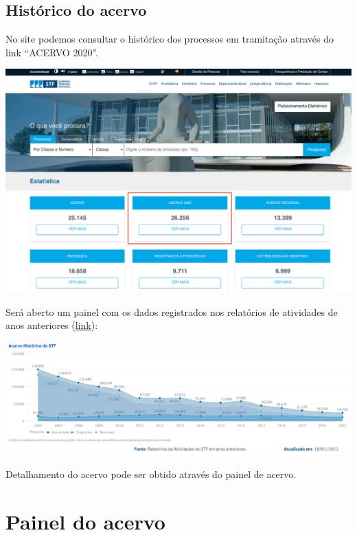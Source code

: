 \documentclass[
]{book}
\begin{document}
\hypertarget{histuxf3rico-do-acervo}{%
\subsection{Histórico do acervo}\label{histuxf3rico-do-acervo}}

No site podemos consultar o histórico dos processos em tramitação através do link ``ACERVO 2020''.

\includegraphics[width=1\linewidth]{imagens/fig-cap4-1}

Será aberto um painel com os dados registrados nos relatórios de atividades de anos anteriores (\href{https://transparencia.stf.jus.br/single/?appid=e554950b-d244-487b-991d-abcc693bfa7c\&sheet=ea8942c2-79fa-494f-bf18-ca6d5a3bfb43\&theme=simplicity\&opt=currsel\&select=clearall}{link}):

\includegraphics[width=1\linewidth]{imagens/fig-cap4-2}

Detalhamento do acervo pode ser obtido através do painel de acervo.

\hypertarget{painel-do-acervo}{%
\section{Painel do acervo}\label{painel-do-acervo}}
\end{document}
